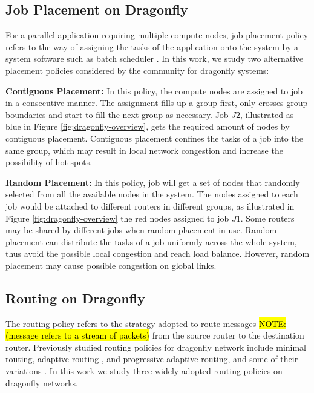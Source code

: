 \documentclass[conference,compsoc]{IEEEtran}
\newcommand{\NOTE}[1]{\hl {NOTE: #1}}
\begin{document}
\subsection{Job Placement on Dragonfly}
\label{sec:placement-schemes}

For a parallel application requiring multiple compute nodes, job placement policy refers to the way of assigning the tasks of the application onto the system by a system software such as batch scheduler \cite{xu-cluster14}. In this work, we study two alternative placement policies considered by the community for dragonfly systems: 


\textbf{Contiguous Placement:} In this policy, the compute nodes are assigned to job in a consecutive manner. The assignment fills up a group first, only crosses group boundaries and start to fill the next group as necessary. Job $J2$, illustrated as blue in Figure \ref{fig:dragonfly-overview}, gets the required amount of nodes by contiguous placement. Contiguous placement confines the tasks of a job into the same group, which may result in local network congestion and increase the possibility of hot-spots. 

\textbf{Random Placement:} In this policy, job will get a set of nodes that randomly selected from all the available nodes in the system. The nodes assigned to each job would be attached to different routers in different groups, as illustrated in Figure \ref{fig:dragonfly-overview} the red nodes assigned to job $J1$. Some routers may be shared by different jobs when random placement in use. Random placement can distribute the tasks of  a job uniformly across the whole system, thus avoid the possible local congestion and reach load balance. However, random placement may cause possible congestion on global links.


\subsection{Routing on Dragonfly}
\label{sec:routing-schemes}
The routing policy refers to the strategy adopted to route messages \NOTE{(message refers to a stream of packets)} from the source router to the destination router. Previously studied routing policies for dragonfly network include minimal routing, adaptive routing \cite{dally-dragonfly}, and progressive adaptive routing\cite{jiang}, and some of their variations \cite{won-prog-adaptive}. In this work we study three widely adopted routing policies on dragonfly networks.
\end{document}
